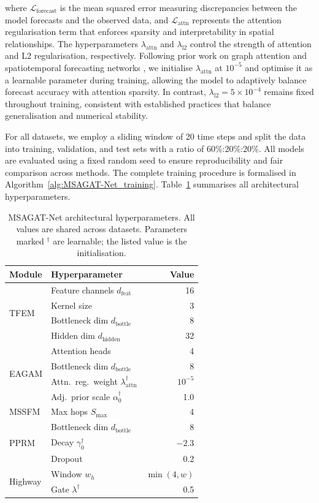 \documentclass[a4paper,fleqn]{cas-dc}
\begin{document}
where $\mathcal{L}_{\text{forecast}}$ is the mean squared error measuring discrepancies between the model forecasts and the observed data, and $\mathcal{L}_{\text{attn}}$ represents the attention regularisation term that enforces sparsity and interpretability in spatial relationships. The hyperparameters $\lambda_{\text{attn}}$ and $\lambda_{\text{l2}}$ control the strength of attention and L2 regularisation, respectively. Following prior work on graph attention and spatiotemporal forecasting networks \cite{velickovic2017graph, zhang2019spatial, xie2022epignn, dengColaGNNCrosslocationAttention2020a, wang2020linformer}, we initialise $\lambda_{\text{attn}}$ at $10^{-5}$ and optimise it as a learnable parameter during training, allowing the model to adaptively balance forecast accuracy with attention sparsity. In contrast, $\lambda_{\text{l2}} = 5 \times 10^{-4}$ remains fixed throughout training, consistent with established practices that balance generalisation and numerical stability.

For all datasets, we employ a sliding window of 20 time steps and split the data into training, validation, and test sets with a ratio of 60\%:20\%:20\%. All models are evaluated using a fixed random seed to ensure reproducibility and fair comparison across methods. The complete training procedure is formalised in Algorithm~\ref{alg:MSAGAT-Net_training}. Table~\ref{tab:hyperparameters} summarises all architectural hyperparameters.

\begin{table}[!htbp]
\centering
\caption{MSAGAT-Net architectural hyperparameters. All values are shared across datasets. Parameters marked $^\dagger$ are learnable; the listed value is the initialisation.}
\label{tab:hyperparameters}
\begin{tabular}{@{}llr@{}}
\toprule
\textbf{Module} & \textbf{Hyperparameter} & \textbf{Value} \\
\midrule
\multirow{4}{*}{TFEM}
 & Feature channels $d_{\text{feat}}$ & 16 \\
 & Kernel size & 3 \\
 & Bottleneck dim $d_{\text{bottle}}$ & 8 \\
 & Hidden dim $d_{\text{hidden}}$ & 32 \\
\midrule
\multirow{4}{*}{EAGAM}
 & Attention heads & 4 \\
 & Bottleneck dim $d_{\text{bottle}}$ & 8 \\
 & Attn.\ reg.\ weight $\lambda_{\text{attn}}^{\dagger}$ & $10^{-5}$ \\
 & Adj.\ prior scale $\alpha_0^{\dagger}$ & 1.0 \\
\midrule
MSSFM & Max hops $S_{\max}$ & 4 \\
\midrule
\multirow{3}{*}{PPRM}
 & Bottleneck dim $d_{\text{bottle}}$ & 8 \\
 & Decay $\gamma_0^{\dagger}$ & $-2.3$ \\
 & Dropout & 0.2 \\
\midrule
\multirow{2}{*}{Highway}
 & Window $w_h$ & $\min(4, w)$ \\
 & Gate $\lambda^{\dagger}$ & 0.5 \\
\bottomrule
\end{tabular}
\end{table}
\end{document}
